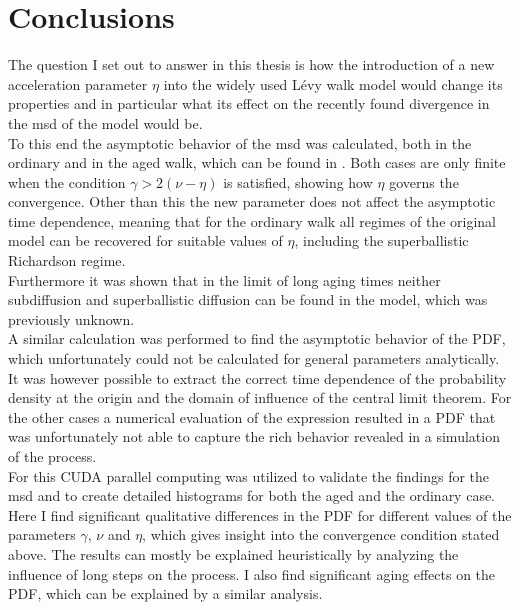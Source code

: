 \chapter{Conclusions}

The question I set out to answer in this thesis is how the introduction of a new acceleration parameter $\eta$ into the widely used L\'evy walk model would change its properties and in particular what its effect on the recently found divergence in the \gls{msd} of the model would be. \\

To this end the asymptotic behavior of the \gls{msd} was calculated, both in the ordinary and in the aged walk, which can be found in \cite{bothe}. Both cases are only finite when the condition $\gamma > 2(\nu-\eta)$ is satisfied, showing how $\eta$ governs the convergence. Other than this the new parameter does not affect the asymptotic time dependence, meaning that for the ordinary walk all regimes of the original model can be recovered for suitable values of $\eta$, including the superballistic Richardson regime. \\
{\color{blue}
Furthermore it was shown that in the limit of long aging times neither subdiffusion and superballistic diffusion can be found in the model, which was previously unknown.
}\\

A similar calculation was performed to find the asymptotic behavior of the \gls{PDF}, which unfortunately could not be calculated for general parameters analytically. It was however possible to extract the correct time dependence of the probability density at the origin and the domain of influence of the central limit theorem. For the other cases a numerical evaluation of the expression resulted in a \gls{PDF} that was unfortunately not able to capture the rich behavior revealed in a simulation of the process. \\
For this CUDA parallel computing was utilized to validate the findings for the \gls{msd} and to create detailed histograms for both the aged and the ordinary case. Here I find significant qualitative differences in the \gls{PDF} for different values of the parameters $\gamma$, $\nu$ and $\eta$, which gives insight into the convergence condition stated above. The results can mostly be explained heuristically by analyzing the influence of long steps on the process. I also find significant aging effects on the \gls{PDF}, which can be explained by a similar analysis.\\

